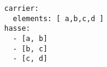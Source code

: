 \par\begin{minipage}{60ex}
\begin{verbatim}
carrier:
  elements: [ a,b,c,d ]
hasse:
  - [a, b]
  - [b, c]
  - [c, d]

\end{verbatim}
\end{minipage}\par